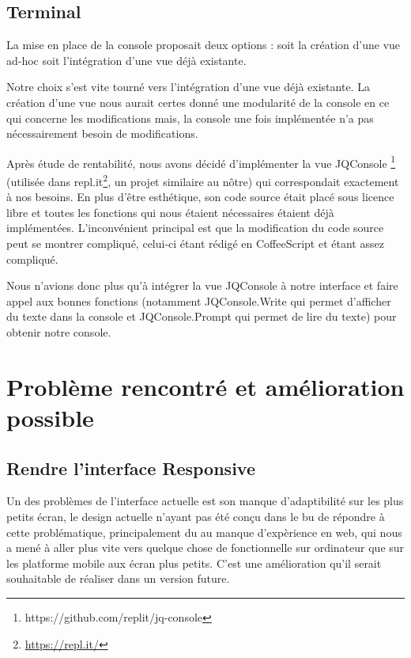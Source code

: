 \subsection{Terminal}
\label{subsec-terminal}

\par La mise en place de la console proposait deux options : soit la création d'une vue ad-hoc soit l'intégration d'une vue déjà existante.

\par Notre choix s'est vite tourné vers l'intégration d'une vue déjà existante. La création d'une vue nous aurait certes donné une modularité de la console en ce qui concerne les modifications mais, la console une fois implémentée n'a pas nécessairement besoin de modifications.

\par Après étude de rentabilité, nous avons décidé d'implémenter la vue JQConsole \footnote{https://github.com/replit/jq-console} (utilisée dans repl.it\footnote{\url{https://repl.it/}}, un projet similaire au nôtre) qui correspondait exactement à nos besoins. En plus d'être esthétique, son code source était placé sous licence libre et toutes les fonctions qui nous étaient nécessaires étaient déjà implémentées. L'inconvénient principal est que la modification du code source peut se montrer compliqué, celui-ci étant rédigé en CoffeeScript et étant assez compliqué.

\par Nous n'avions donc plus qu'à intégrer la vue JQConsole à notre interface et faire appel aux bonnes fonctions (notamment JQConsole.Write qui permet d'afficher du texte dans la console et JQConsole.Prompt qui permet de lire du texte) pour obtenir notre console.

\section{Problème rencontré et amélioration possible}

\subsection{Rendre l'interface Responsive}
Un des problèmes de l'interface actuelle est son manque d'adaptibilité sur les plus petits écran, le design actuelle n'ayant pas été conçu dans le bu de répondre à cette problématique, principalement du au manque d'expèrience en web, qui nous a mené à aller plus vite vers quelque chose de fonctionnelle sur ordinateur que sur les platforme mobile aux écran plus petits. C'est une amélioration qu'il serait souhaitable de réaliser dans un version future.

